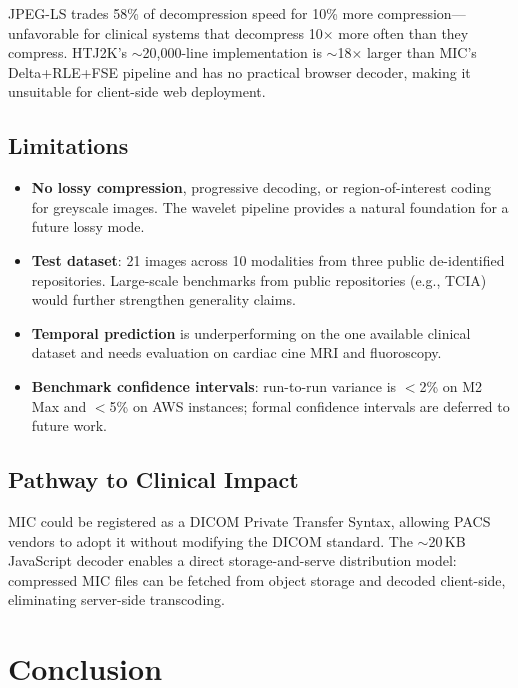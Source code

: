 \documentclass[journal]{IEEEtran}
\begin{document}
JPEG-LS trades 58\% of decompression speed for 10\% more compression---unfavorable
for clinical systems that decompress 10$\times$ more often than they compress.
HTJ2K's $\sim$20,000-line implementation is $\sim$18$\times$ larger than MIC's
Delta+RLE+FSE pipeline and has no practical browser decoder, making it unsuitable
for client-side web deployment.

\subsection{Limitations}

\begin{itemize}
  \item \textbf{No lossy compression}, progressive decoding, or
  region-of-interest coding for greyscale images. The wavelet pipeline provides
  a natural foundation for a future lossy mode.
  \item \textbf{Test dataset}: 21 images across 10 modalities from three public
  de-identified repositories. Large-scale benchmarks from public repositories
  (e.g., TCIA) would further strengthen generality claims.
  \item \textbf{Temporal prediction} is underperforming on the one available
  clinical dataset and needs evaluation on cardiac cine MRI and fluoroscopy.
  \item \textbf{Benchmark confidence intervals}: run-to-run variance is $<$2\%
  on M2 Max and $<$5\% on AWS instances; formal confidence intervals are deferred
  to future work.
\end{itemize}

\subsection{Pathway to Clinical Impact}

MIC could be registered as a DICOM Private Transfer Syntax, allowing PACS
vendors to adopt it without modifying the DICOM standard. The $\sim$20\,KB
JavaScript decoder enables a direct storage-and-serve distribution model:
compressed MIC files can be fetched from object storage and decoded client-side,
eliminating server-side transcoding.

\section{Conclusion}
\label{sec:conclusion}
\end{document}
